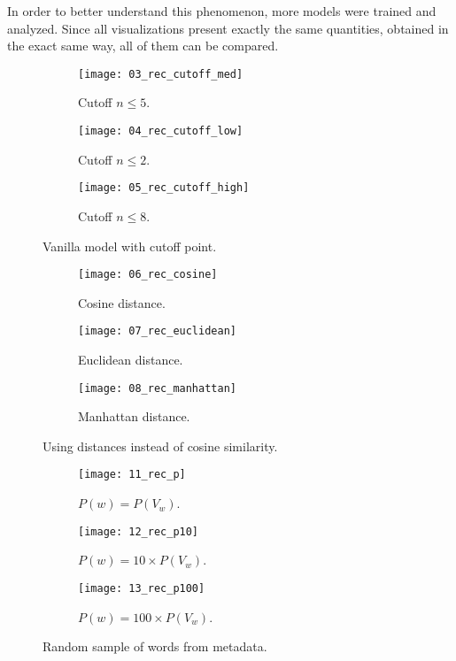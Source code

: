 In order to better understand this phenomenon, more models were trained and
analyzed. Since all visualizations present exactly the same quantities, obtained
in the exact same way, all of them can be compared.

\begin{figure}
  \centering
  \begin{subfigure}{0.3\textwidth}
    \centering
    \texttt{[image: 03\_rec\_cutoff\_med]}
    \caption{Cutoff $n \leqslant 5$.\label{fig:fig2:a}}
  \end{subfigure}
  \begin{subfigure}{0.3\textwidth}
    \centering
    \texttt{[image: 04\_rec\_cutoff\_low]}
    \caption{Cutoff $n \leqslant 2$.\label{fig:fig2:b}}
  \end{subfigure}
  \begin{subfigure}{0.3\textwidth}
    \centering
    \texttt{[image: 05\_rec\_cutoff\_high]}
    \caption{Cutoff $n \leqslant 8$.\label{fig:fig2:c}}
  \end{subfigure}
  \caption{Vanilla model with cutoff point.\label{fig:fig2}}
\end{figure}

\begin{figure}
  \centering
  \begin{subfigure}{0.3\textwidth}
    \centering
    \texttt{[image: 06\_rec\_cosine]}
    \caption{Cosine distance.\label{fig:fig3:a}}
  \end{subfigure}
  \begin{subfigure}{0.3\textwidth}
    \centering
    \texttt{[image: 07\_rec\_euclidean]}
    \caption{Euclidean distance.\label{fig:fig3:b}}
  \end{subfigure}
  \begin{subfigure}{0.3\textwidth}
    \centering
    \texttt{[image: 08\_rec\_manhattan]}
    \caption{Manhattan distance.\label{fig:fig3:c}}
  \end{subfigure}
  \caption{Using distances instead of cosine similarity.\label{fig:fig3}}
\end{figure}

\begin{figure}
  \centering
  \begin{subfigure}{0.3\textwidth}
    \centering
    \texttt{[image: 11\_rec\_p]}
    \caption{$P(w) = P(V_w)$.\label{fig:fig4:a}}
  \end{subfigure}
  \begin{subfigure}{0.3\textwidth}
    \centering
    \texttt{[image: 12\_rec\_p10]}
    \caption{$P(w) = 10 \times P(V_w)$.\label{fig:fig4:b}}
  \end{subfigure}
  \begin{subfigure}{0.3\textwidth}
    \centering
    \texttt{[image: 13\_rec\_p100]}
    \caption{$P(w) = 100 \times P(V_w)$.\label{fig:fig4:c}}
  \end{subfigure}
  \caption{Random sample of words from metadata.\label{fig:fig4}}
\end{figure}

